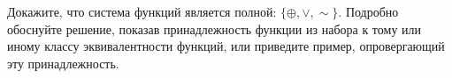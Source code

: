 \question
Докажите, что система функций является полной: $\{\oplus, \vee, \sim\}$. Подробно обоснуйте решение, показав  принадлежность функции из набора к тому или иному классу эквивалентности функций, или приведите пример, опровергающий эту принадлежность.

